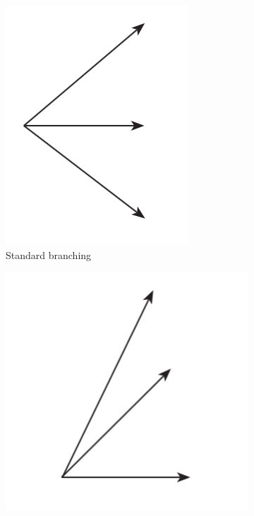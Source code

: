 \begin{figure}[H]
\centering
\begin{subfigure}{.3\textwidth}
  \centering
  \includegraphics[width=.7\linewidth]{img/standardbranch.jpg}
  \caption{Standard branching}
  \label{fig:background:standardbranching}
\end{subfigure}
\begin{subfigure}{.3\textwidth}
  \centering
  \includegraphics[width=.93\linewidth]{img/bottombranch.jpg}

\end{subfigure}
\end{figure}
